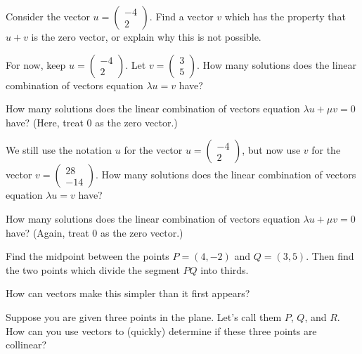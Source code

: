 \documentclass[elementsmain.tex]{subfiles}
\begin{document}
\begin{exercise}
Consider the vector $u = \left(\begin{smallmatrix} -4 \\ 2\end{smallmatrix}\right)$. Find a vector $v$ which has the property that $u+v$ is the zero vector, or explain why this is not possible.
\end{exercise}


\begin{exercise}
For now, keep $u = \left(\begin{smallmatrix} -4 \\ 2\end{smallmatrix}\right)$. 
Let $v = \left(\begin{smallmatrix} 3 \\ 5 \end{smallmatrix}\right)$.
How many solutions does the linear combination of vectors equation
$\lambda u = v$
have?

How many solutions does the linear combination of vectors equation 
$\lambda u + \mu v = 0$
have? (Here, treat $0$ as the zero vector.)
\end{exercise}

\begin{exercise}
We still use the notation $u$ for the vector $u = \left(\begin{smallmatrix} -4 \\ 2\end{smallmatrix}\right)$, but now use $v$ for the vector $v = \left(\begin{smallmatrix} 28 \\ -14\end{smallmatrix}\right)$.
How many solutions does the linear combination of vectors equation $\lambda u = v$
have?

How many solutions does the linear combination of vectors equation 
$\lambda u + \mu v = 0$ have? (Again, treat $0$ as the zero vector.)
\end{exercise}

\begin{exercise}
Find the midpoint between the points $P = (4,-2)$ and $Q=(3,5)$. Then find the two points which divide the segment $PQ$ into thirds.

How can vectors make this simpler than it first appears?
\end{exercise}

\begin{challenge}
Suppose you are given three points in the plane. Let's call them $P$, $Q$, and $R$.
How can you use vectors to (quickly) determine if these three points are collinear?
\end{challenge}
\end{document}
